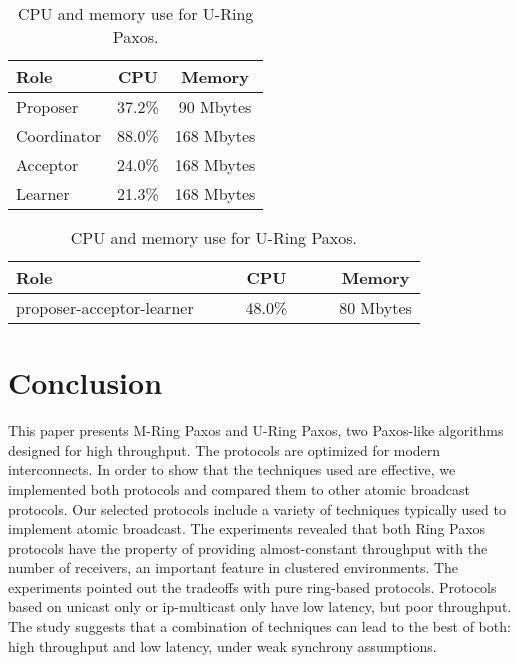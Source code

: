\documentclass[final,3p,times,twocolumn,authoryear]{elsarticle}
\begin{document}
\begin{table}
\begin{minipage}[t]{0.5\linewidth} \caption{CPU and memory use for M-Ring Paxos.}\vspace{4mm}
\label{table:mringpaxos}

\begin{tabular}{l|c|c} \hline
Role            & \hspace{5mm}CPU\hspace{5mm}     & \hspace{5mm}Memory\hspace{5mm} \\ \hline
Proposer     & 37.2\% & 90 Mbytes \\
Coordinator & 88.0\% & 168 Mbytes \\
Acceptor     & 24.0\% & 168 Mbytes \\
Learner       & 21.3\% & 168 Mbytes \\ \hline
\end{tabular}
\end{minipage}
\hspace{10mm}
\begin{minipage}[t]{0.5\linewidth}
\caption{CPU and memory use for U-Ring Paxos.}\vspace{4mm}
\label{table:uringpaxos}
\begin{tabular}{l|c|c} \hline
Role            & ~~~~CPU~~~~     & Memory \\ \hline
proposer-acceptor-learner     & 48.0\% & 80 Mbytes \\ \hline
\end{tabular}
\end{minipage}

\end{table}


\section{Conclusion}
\label{sec:final}

This paper presents M-Ring Paxos and U-Ring Paxos, two Paxos-like algorithms designed for high throughput. The protocols are optimized for modern interconnects. In order to show that the techniques used are effective, we implemented both protocols and compared them to other atomic broadcast protocols. Our selected protocols include a variety of techniques typically used to implement atomic broadcast. The experiments revealed that both Ring Paxos protocols have the property of providing almost-constant throughput with the number of receivers, an important feature in clustered environments. The experiments pointed out the tradeoffs with pure ring-based protocols. Protocols based on unicast only or ip-multicast only have low latency, but poor throughput. The study suggests that a combination of techniques can lead to the best of both: high throughput and low latency, under weak synchrony assumptions. 
\end{document}
